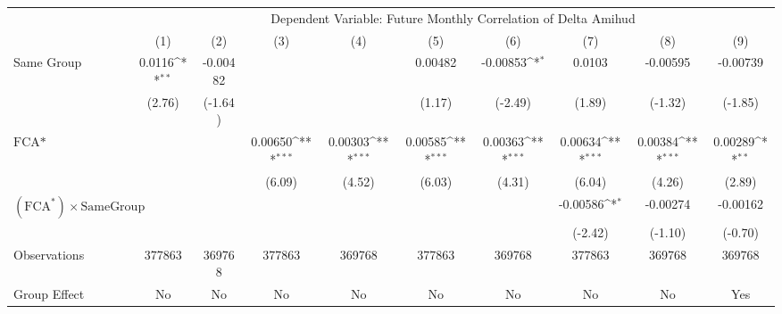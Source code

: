 {
\def\sym#1{\ifmmode^{#1}\else\(^{#1}\)\fi}
\begin{tabular}{l*{9}{c}}
\hline\hline
                &\multicolumn{9}{c}{Dependent Variable: Future Monthly Correlation of Delta Amihud}                                                                                        \\\cmidrule(lr){2-10}
                &\multicolumn{1}{c}{(1)}         &\multicolumn{1}{c}{(2)}         &\multicolumn{1}{c}{(3)}         &\multicolumn{1}{c}{(4)}         &\multicolumn{1}{c}{(5)}         &\multicolumn{1}{c}{(6)}         &\multicolumn{1}{c}{(7)}         &\multicolumn{1}{c}{(8)}         &\multicolumn{1}{c}{(9)}         \\
\hline
Same Group      &   0.0116\sym{**} & -0.00482         &                  &                  &  0.00482         & -0.00853\sym{*}  &   0.0103         & -0.00595         & -0.00739         \\
                &   (2.76)         &  (-1.64)         &                  &                  &   (1.17)         &  (-2.49)         &   (1.89)         &  (-1.32)         &  (-1.85)         \\
[1em]
$ \text{FCA*} $ &                  &                  &  0.00650\sym{***}&  0.00303\sym{***}&  0.00585\sym{***}&  0.00363\sym{***}&  0.00634\sym{***}&  0.00384\sym{***}&  0.00289\sym{**} \\
                &                  &                  &   (6.09)         &   (4.52)         &   (6.03)         &   (4.31)         &   (6.04)         &   (4.26)         &   (2.89)         \\
[1em]
 $ (\text{FCA}^*) \times {\text{SameGroup} }  $ &                  &                  &                  &                  &                  &                  & -0.00586\sym{*}  & -0.00274         & -0.00162         \\
                &                  &                  &                  &                  &                  &                  &  (-2.42)         &  (-1.10)         &  (-0.70)         \\
\hline
Observations    &   377863         &   369768         &   377863         &   369768         &   377863         &   369768         &   377863         &   369768         &   369768         \\
Group Effect    &       No         &       No         &       No         &       No         &       No         &       No         &       No         &       No         &      Yes         \\

\end{tabular}}
